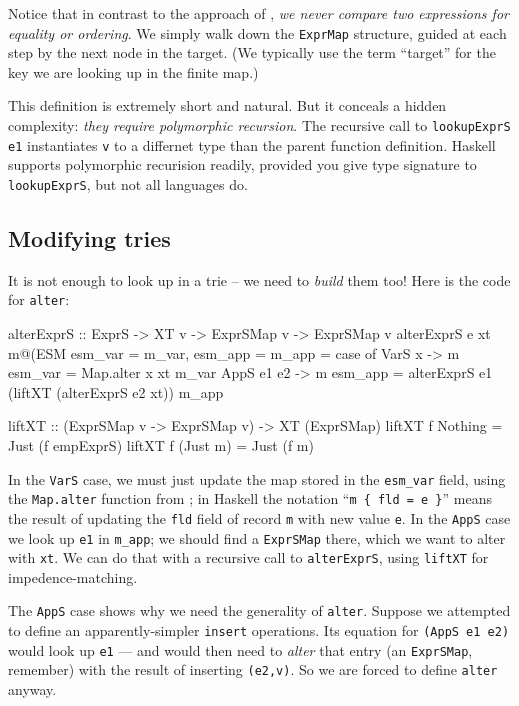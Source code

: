 \documentclass[acmsmall]{acmart}
\theoremstyle{theorem}
\theoremstyle{definition}
\theoremstyle{remark}
\begin{document}
Notice that in contrast to the approach of , \emph{we never compare two expressions
for equality or ordering}.  We simply walk down the \lstinline{ExprMap} structure, guided
at each step by the next node in the target.  (We typically use the term ``target'' for the
key we are looking up in the finite map.)

This definition is extremely short and natural. But it conceals a hidden
complexity: \emph{they require polymorphic recursion}. The recursive call to \lstinline{lookupExprS e1}
instantiates \lstinline{v} to a differnet type than the parent function definition.
Haskell supports polymorphic recurision readily, provided you give type signature to
\lstinline{lookupExprS}, but not all languages do.

\subsection{Modifying tries} \label{sec:alter}

It is not enough to look up in a trie -- we need to \emph{build} them too!
Here is the code for \lstinline{alter}:
\begin{code}
alterExprS  :: ExprS -> XT v -> ExprSMap v -> ExprSMap v
alterExprS e xt m@(ESM { esm_var = m_var, esm_app = m_app }
  = case of
      VarS x     -> m { esm_var = Map.alter x xt m_var }
      AppS e1 e2 -> m { esm_app = alterExprS e1 (liftXT (alterExprS e2 xt)) m_app }

liftXT :: (ExprSMap v -> ExprSMap v) -> XT (ExprSMap)
liftXT f Nothing  = Just (f empExprS)
liftXT f (Just m) = Just (f m)
\end{code}
In the \lstinline{VarS} case, we must just update the map stored in the \lstinline{esm_var} field,
using the \lstinline{Map.alter} function from ;
in Haskell the notation ``\lstinline|m { fld = e }|'' means the result
of updating the \lstinline{fld} field of record \lstinline{m} with new value \lstinline{e}.
In the \lstinline{AppS} case we look up \lstinline{e1} in \lstinline{m_app};
we should find a \lstinline{ExprSMap} there, which we want to alter with \lstinline{xt}.
We can do that with a recursive call to \lstinline{alterExprS}, using \lstinline{liftXT}
for impedence-matching.

The \lstinline{AppS} case shows why we need the generality of \lstinline{alter}.
Suppose we attempted to define an apparently-simpler \lstinline{insert} operations.
Its equation for \lstinline{(AppS e1 e2)} would look up \lstinline{e1} --- and would then
need to \emph{alter} that entry (an \lstinline{ExprSMap}, remember) with the result of
inserting \lstinline{(e2,v)}.  So we are forced to define \lstinline{alter} anyway.
\end{document}
